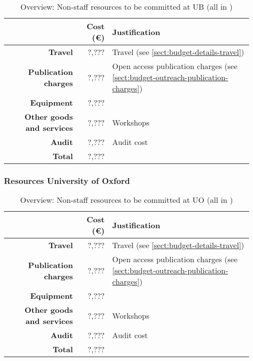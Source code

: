 \bigskip
\begin{table}[H]
\begin{tabular}{|r|r|p{9cm}|}
\hline
\textbf{} & \textbf{Cost (\euro)} & \textbf{Justification} \\\hline
\textbf{Travel} & ?,??? & Travel (see \ref{sect:budget-details-travel})\\\hline
\textbf{Publication charges} & ?,??? & Open access publication charges (see \ref{sect:budget-outreach-publication-charges})\\\hline
\textbf{Equipment} & ?,??? &  \\\hline    %

\textbf{Other goods and services} & ?,??? & Workshops \\\hline   %
\textbf{Audit} & ?,??? & Audit cost \\\hline
\textbf{Total} & ?,???\\\cline{1-2}
\end{tabular}
\caption{Overview: Non-staff resources to be committed at UB (all in \texteuro)}\vspace*{-1em}
\end{table}




\subsubsection{Resources University of Oxford}


\bigskip
\begin{table}[H]
\begin{tabular}{|r|r|p{9cm}|}
\hline
\textbf{} & \textbf{Cost (\euro)} & \textbf{Justification} \\\hline
\textbf{Travel} & ?,??? & Travel (see \ref{sect:budget-details-travel})\\\hline
\textbf{Publication charges} & ?,??? & Open access publication charges (see \ref{sect:budget-outreach-publication-charges})\\\hline
\textbf{Equipment} & ?,??? &  \\\hline    %

\textbf{Other goods and services} & ?,??? & Workshops \\\hline   %
\textbf{Audit} & ?,??? & Audit cost \\\hline
\textbf{Total} & ?,???\\\cline{1-2}
\end{tabular}
\caption{Overview: Non-staff resources to be committed at UO (all in \texteuro)}\vspace*{-1em}
\end{table}




